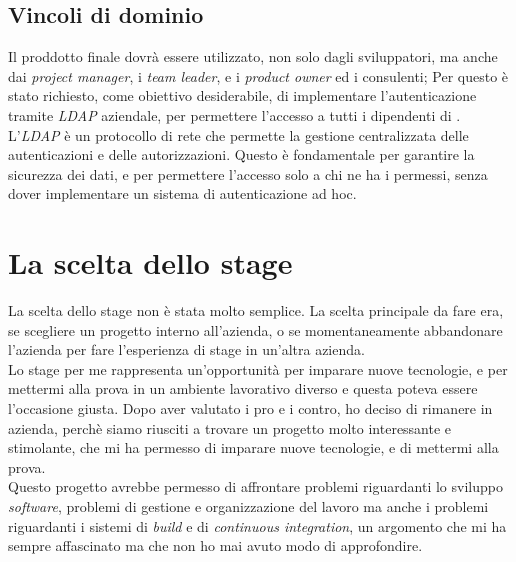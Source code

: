 \subsection*{ Vincoli di dominio}
Il proddotto finale dovrà essere utilizzato, non solo dagli sviluppatori, ma anche dai \textit{project manager}, i \textit{team leader}, e i \textit{product owner} ed
i consulenti; Per questo è stato richiesto, come obiettivo desiderabile, di implementare l'autenticazione tramite \textit{LDAP} aziendale, 
per permettere l'accesso a tutti i dipendenti di {\azienda}.\\
L'\textit{LDAP} è un protocollo di rete che permette la gestione centralizzata delle autenticazioni e delle autorizzazioni.
Questo è fondamentale per garantire la sicurezza dei dati, e per permettere l'accesso solo a chi ne ha i permessi, senza dover
implementare un sistema di autenticazione ad hoc.\\



\section{La scelta dello stage}
La scelta dello stage non è stata molto semplice. La scelta principale da fare era, se scegliere un progetto interno all'azienda, o 
se momentaneamente abbandonare l'azienda per fare l'esperienza di stage in un'altra azienda.\\ 
Lo stage per me rappresenta un'opportunità per imparare nuove tecnologie, e per mettermi alla prova in un ambiente lavorativo diverso 
e questa poteva essere l'occasione giusta. Dopo aver valutato i pro e i contro, ho deciso di rimanere in azienda, perchè siamo riusciti
a trovare un progetto molto interessante e stimolante, che mi ha permesso di imparare nuove tecnologie, e di mettermi alla prova.\\

Questo progetto avrebbe permesso di affrontare problemi riguardanti lo sviluppo \textit{software}, problemi di gestione e organizzazione del lavoro ma 
anche i problemi riguardanti i sistemi di \textit{build} e di \textit{continuous integration}, un argomento che mi ha sempre affascinato ma che non ho mai
avuto modo di approfondire.\\

